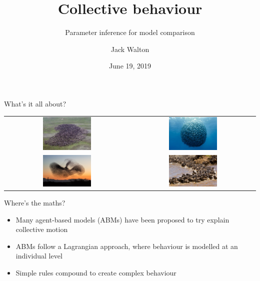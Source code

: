 \documentclass[12pt]{beamer}
\title{Collective behaviour}
\subtitle{Parameter inference for model comparison}
\author{Jack Walton}
\date{June 19, 2019}
\institute{Newcastle University}
\renewcommand{\emph}[1]{{\color{mLightBrown}#1}}
\begin{document}
\maketitle

\begin{frame}{What's it all about?}
  \centering
  \vspace{0.85cm}
  \renewcommand{\arraystretch}{2.4}
  \begin{tabular}{@{}cc@{}}
    \includegraphics[width=0.4\textwidth]{caribou.jpg}              &
    \includegraphics[width=0.4\textwidth]{milling_fish.jpg}           \\
    \includegraphics[width=0.4\textwidth]{starling_murmuration.jpg} &
    \includegraphics[width=0.4\textwidth]{wildebeest.jpg}
  \end{tabular}
\end{frame}

\begin{frame}{Where's the maths?}
  \begin{itemize}
    \setlength\itemsep{1em}
    \item Many \emph{agent-based models} (ABMs) have been proposed to try explain collective
          motion
    \item ABMs follow a \emph{Lagrangian} approach, where behaviour is modelled at an individual
          level
    \item \alert{Simple rules} compound to create \alert{complex behaviour}
  \end{itemize}
\end{frame}
\end{document}
